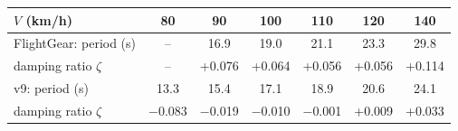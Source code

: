 \begin{tabular}{lcccccc}
\toprule
$V$ (km/h) & 80 & 90 & 100 & 110 & 120 & 140 \\
\midrule
FlightGear: period (s) & -- & 16.9 & 19.0 & 21.1 & 23.3 & 29.8 \\
\quad damping ratio $\zeta$ & -- & +0.076 & +0.064 & +0.056 & +0.056 & +0.114 \\
v9: period (s) & 13.3 & 15.4 & 17.1 & 18.9 & 20.6 & 24.1 \\
\quad damping ratio $\zeta$ & $-$0.083 & $-$0.019 & $-$0.010 & $-$0.001 & +0.009 & +0.033 \\
\bottomrule
\end{tabular}
